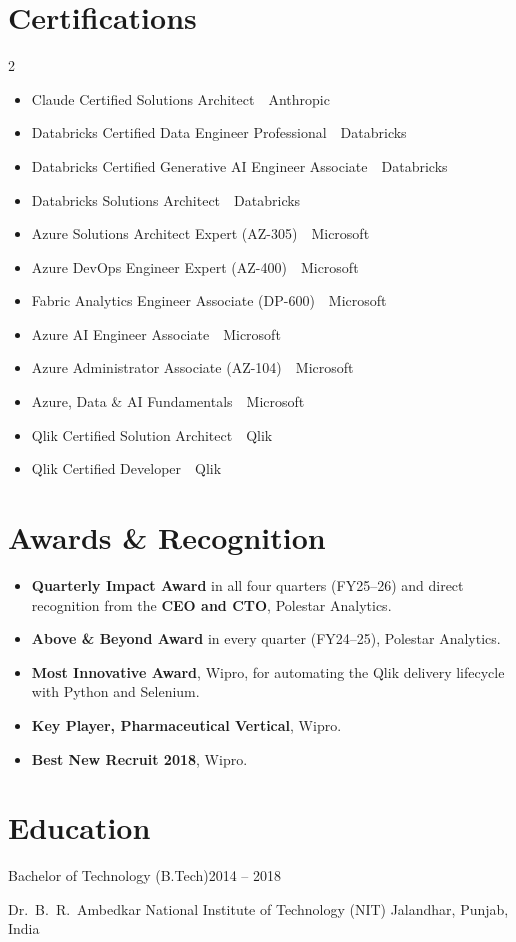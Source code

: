 \documentclass[10pt,a4paper]{article}
\newcommand{\cert}[2]{\item {\color{navy}#1}\ {\color{muted}\small\textbar\ #2}}
\begin{document}
\section{Certifications}
\begin{multicols}{2}
\begin{itemize}
  \cert{Claude Certified Solutions Architect}{Anthropic}
  \cert{Databricks Certified Data Engineer Professional}{Databricks}
  \cert{Databricks Certified Generative AI Engineer Associate}{Databricks}
  \cert{Databricks Solutions Architect}{Databricks}
  \cert{Azure Solutions Architect Expert (AZ-305)}{Microsoft}
  \cert{Azure DevOps Engineer Expert (AZ-400)}{Microsoft}
  \cert{Fabric Analytics Engineer Associate (DP-600)}{Microsoft}
  \cert{Azure AI Engineer Associate}{Microsoft}
  \cert{Azure Administrator Associate (AZ-104)}{Microsoft}
  \cert{Azure, Data \& AI Fundamentals}{Microsoft}
  \cert{Qlik Certified Solution Architect}{Qlik}
  \cert{Qlik Certified Developer}{Qlik}
\end{itemize}
\end{multicols}
\vspace{-8pt}

\section{Awards \& Recognition}
\begin{itemize}
  \item \textbf{Quarterly Impact Award} in all four quarters (FY25--26) and direct recognition from the \textbf{CEO and CTO}, Polestar Analytics.
  \item \textbf{Above \& Beyond Award} in every quarter (FY24--25), Polestar Analytics.
  \item \textbf{Most Innovative Award}, Wipro, for automating the Qlik delivery lifecycle with Python and Selenium.
  \item \textbf{Key Player, Pharmaceutical Vertical}, Wipro.
  \item \textbf{Best New Recruit 2018}, Wipro.
\end{itemize}

\section{Education}
{\color{navy}\large Bachelor of Technology (B.Tech)}\hfill{\color{muted}\small 2014 -- 2018}\par
Dr.\ B.\ R.\ Ambedkar National Institute of Technology (NIT) Jalandhar, Punjab, India
\end{document}
